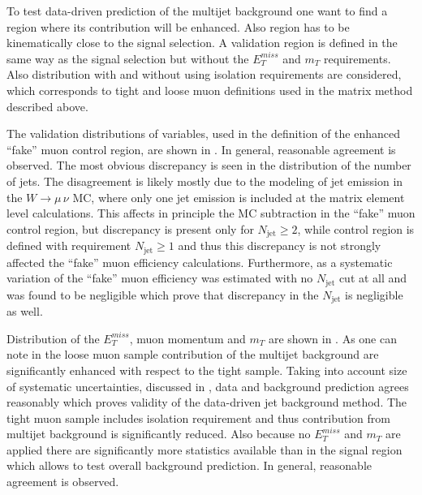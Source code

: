 
To test data-driven prediction of the multijet background one want to find a region
where its contribution will be enhanced. Also region has to be kinematically 
close to the signal selection.
A validation region is defined in the same way as the signal selection but without the $E_T^{miss}$ and $m_T$ requirements. Also distribution with and without using isolation requirements are considered, 
which corresponds to tight and loose muon definitions used in the matrix method described above.

The validation distributions of variables, used in the definition of the enhanced ``fake'' muon control region, are shown in .
In general, reasonable agreement is observed. The most obvious discrepancy is seen in the
distribution of the number of jets. The disagreement is likely mostly due to the modeling
of jet emission in the $W\to\mu\,\nu$ MC, where only one jet emission is included at the
matrix element level calculations.
This affects in principle the MC subtraction in the ``fake'' muon control region,
but discrepancy is present only for $N_\mathrm{jet}\geq2$, while control region is 
defined with requirement $N_\mathrm{jet}\geq1$ and thus this discrepancy is not 
strongly affected the ``fake'' muon efficiency calculations.
Furthermore, as a systematic variation of the ``fake'' muon efficiency was estimated with no $N_\mathrm{jet}$ cut at all and was found to be negligible which prove that discrepancy in
the $N_\mathrm{jet}$ is negligible as well.

Distribution of the $E_T^{miss}$, muon momentum and $m_T$ are shown in .
As one can note in the loose muon sample contribution of the multijet background are significantly enhanced with respect to the tight sample. 
Taking into account size of systematic uncertainties, discussed in , data and background prediction agrees reasonably which proves validity of the data-driven jet background method.
The tight muon sample includes isolation requirement and thus contribution from multijet background is significantly reduced. Also because no $E_T^{miss}$ and $m_T$ are applied 
there are significantly more statistics available than in the signal region which allows 
to test overall background prediction. In general, reasonable agreement is observed. 

